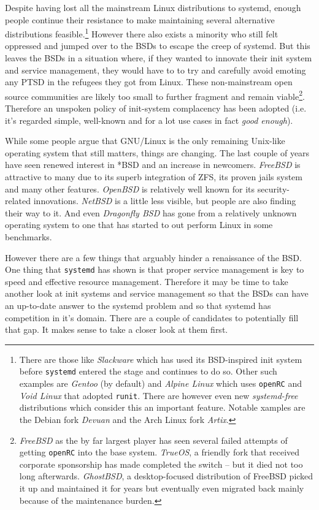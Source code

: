 \documentclass{article}
\begin{document}
Despite having lost all the mainstream Linux distributions to systemd, enough people continue their resistance to make maintaining several alternative distributions feasible.\footnote{There are those like \textit{Slackware} which has used its BSD-inspired init system before \texttt{systemd} entered the stage and continues to do so. Other such examples are \textit{Gentoo} (by default) and \textit{Alpine Linux} which uses \texttt{openRC} and \textit{Void Linux} that adopted \texttt{runit}. There are however even new \textit{systemd-free} distributions which consider this an important feature. Notable xamples are the Debian fork \textit{Devuan} and the Arch Linux fork \textit{Artix}.} However there also exists a minority who still felt oppressed and jumped over to the BSDs to escape the creep of systemd. But this leaves the BSDs in a situation where, if they wanted to innovate their init system and service management, they would have to to try and carefully avoid emoting any PTSD in the refugees they got from Linux. These non-mainstream open source communities are likely too small to further fragment and remain viable\footnote{\textit{FreeBSD} as the by far largest player has seen several failed attempts of getting \texttt{openRC} into the base system. \textit{TrueOS}, a friendly fork that received corporate sponsorship has made completed the switch -- but it died not too long afterwards. \textit{GhostBSD}, a desktop-focused distribution of FreeBSD picked it up and maintained it for years but eventually even migrated back mainly because of the maintenance burden.}. Therefore an unspoken policy of init-system complacency has been adopted (i.e. it's regarded simple, well-known and for a lot use cases in fact \textit{good enough}).

While some people argue that GNU/Linux is the only remaining Unix-like operating system that still matters, things are changing. The last couple of years have seen renewed interest in *BSD and an increase in newcomers. \textit{FreeBSD} is attractive to many due to its superb integration of ZFS, its proven jails system and many other features. \textit{OpenBSD} is relatively well known for its security-related innovations. \textit{NetBSD} is a little less visible, but people are also finding their way to it. And even \textit{Dragonfly BSD} has gone from a relatively unknown operating system to one that has started to out perform Linux in some benchmarks.

However there are a few things that arguably hinder a renaissance of the BSD. One thing that \texttt{systemd} has shown is that proper service management is key to speed and effective resource management. Therefore it may be time to take another look at init systems and service management so that the BSDs can have an up-to-date answer to the systemd problem and so that systemd has competition in it's domain. There are a couple of candidates to potentially fill that gap. It makes sense to take a closer look at them first.
\end{document}
